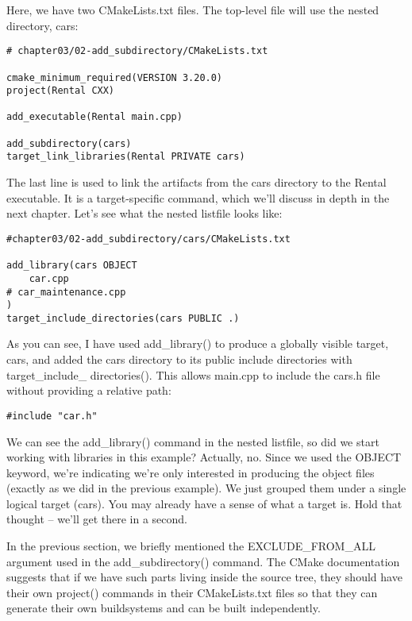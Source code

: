 Here, we have two CMakeLists.txt files. The top-level file will use the nested directory, cars:

\begin{lstlisting}[style=styleCMake]
# chapter03/02-add_subdirectory/CMakeLists.txt

cmake_minimum_required(VERSION 3.20.0)
project(Rental CXX)

add_executable(Rental main.cpp)

add_subdirectory(cars)
target_link_libraries(Rental PRIVATE cars)
\end{lstlisting}

The last line is used to link the artifacts from the cars directory to the Rental executable. It is a target-specific command, which we'll discuss in depth in the next chapter. Let's see what the nested listfile looks like:

\begin{lstlisting}[style=styleCMake]
#chapter03/02-add_subdirectory/cars/CMakeLists.txt

add_library(cars OBJECT
	car.cpp
# car_maintenance.cpp
)
target_include_directories(cars PUBLIC .)
\end{lstlisting}

As you can see, I have used add\_library() to produce a globally visible target, cars, and added the cars directory to its public include directories with target\_include\_ directories(). This allows main.cpp to include the cars.h file without providing a relative path:

\begin{lstlisting}[style=styleCXX]
#include "car.h"
\end{lstlisting}

We can see the add\_library() command in the nested listfile, so did we start working with libraries in this example? Actually, no. Since we used the OBJECT keyword, we're indicating we're only interested in producing the object files (exactly as we did in the previous example). We just grouped them under a single logical target (cars). You may already have a sense of what a target is. Hold that thought – we'll get there in a second.


In the previous section, we briefly mentioned the EXCLUDE\_FROM\_ALL argument used in the add\_subdirectory() command. The CMake documentation suggests that if we have such parts living inside the source tree, they should have their own project() commands in their CMakeLists.txt files so that they can generate their own buildsystems and can be built independently.


